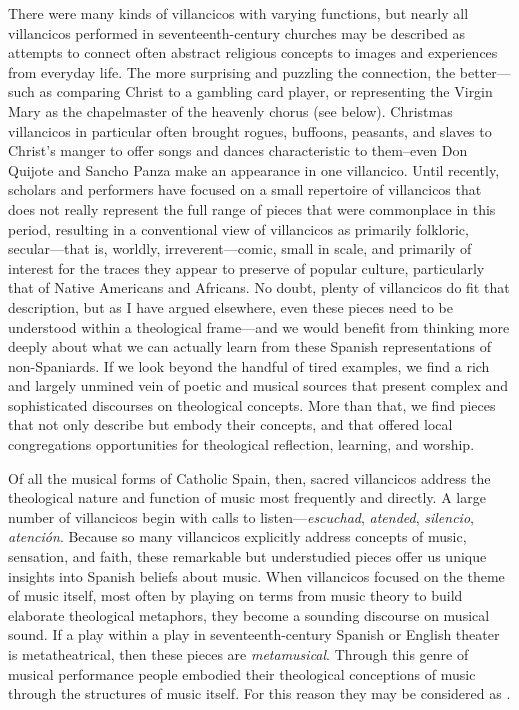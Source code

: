There were many kinds of villancicos with varying functions, but nearly all
villancicos performed in seventeenth-century churches may be described as
attempts to connect often abstract religious concepts to images and experiences
from everyday life.
The more surprising and puzzling the connection, the better---such as comparing
Christ to a gambling card player, or representing the Virgin Mary as the
chapelmaster of the heavenly chorus (see below).%
    \Autocite{Cashner:PlayingCards}
Christmas villancicos in particular often brought rogues, buffoons, peasants,
and slaves to Christ's manger to offer songs and dances characteristic to
them--even Don Quijote and Sancho Panza make an appearance in one villancico.%
Until recently, scholars and performers have focused on a small repertoire of
villancicos that does not really represent the full range of pieces
that were commonplace in this period, resulting in a conventional view of
villancicos as primarily folkloric, secular---that is, worldly,
irreverent---comic, small in scale, and primarily of interest for the traces
they appear to preserve of popular culture, particularly that of Native
Americans and Africans.
No doubt, plenty of villancicos do fit that description, but as I have argued
elsewhere, even these pieces need to be understood within a theological
frame---and we would benefit from thinking more deeply about what we can
actually learn from these Spanish representations of non-Spaniards.%
    \Autocite{Cashner:BuildingSociety}
If we look beyond the handful of tired examples, we find a rich and largely
unmined vein of poetic and musical sources that present complex and
sophisticated discourses on theological concepts.
More than that, we find pieces that not only describe but embody their
concepts, and that offered local congregations opportunities for theological
reflection, learning, and worship.

Of all the musical forms of Catholic Spain, then, sacred villancicos address
the theological nature and function of music most frequently and directly.
A large number of villancicos begin with calls to listen---\emph{escuchad},
\emph{atended}, \emph{silencio}, \emph{atención}. 
Because so many villancicos explicitly address concepts of music, sensation, and
faith, these remarkable but understudied pieces offer us unique insights into
Spanish beliefs about music.
When villancicos focused on the theme of music itself, most often by playing on
terms from music theory to build elaborate theological metaphors, they become a
sounding discourse on musical sound.
If a play within a play in seventeenth-century Spanish or English theater is
metatheatrical, then these pieces are \emph{metamusical}.
Through this genre of musical performance people embodied their theological
conceptions of music through the structures of music itself.
For this reason they may be considered as .

